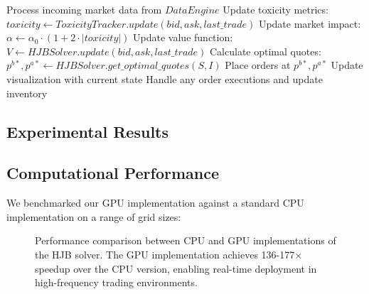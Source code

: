 \documentclass[twocolumn,ieee]{arithmaxresearch}
\begin{document}
\begin{onecolumn}
\begin{onecolumn}
\begin{algorithm}
\begin{algorithmic}[1]
    \State Process incoming market data from $DataEngine$
    \State Update toxicity metrics: $toxicity \gets ToxicityTracker.update(bid, ask, last\_trade)$
    \State Update market impact: $\alpha \gets \alpha_0 \cdot (1 + 2 \cdot |toxicity|)$
    \State Update value function: $V \gets HJBSolver.update(bid, ask, last\_trade)$
    \State Calculate optimal quotes: $p^{b*}, p^{a*} \gets HJBSolver.get\_optimal\_quotes(S, I)$
    \State Place orders at $p^{b*}, p^{a*}$
    \State Update visualization with current state
    \State Handle any order executions and update inventory
\EndWhile
\end{algorithmic}
\end{algorithm}



\end{onecolumn}

\begin{onecolumn}
\section{Experimental Results}

\subsection{Computational Performance}

We benchmarked our GPU implementation against a standard CPU implementation on a range of grid sizes:

\begin{figure}[h]
\centering
{}
\caption{Performance comparison between CPU and GPU implementations of the HJB solver. The GPU implementation achieves 136-177× speedup over the CPU version, enabling real-time deployment in high-frequency trading environments.}
\label{fig:performance}
\end{figure}


\end{onecolumn}
\end{onecolumn}
\end{document}
